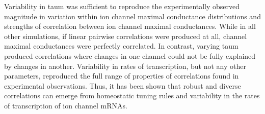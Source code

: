 Variability in \ac{taum} was sufficient to reproduce the experimentally observed magnitude in variation within ion channel maximal conductance distributions and strengths of correlation between ion channel maximal conductances.
While in all other simulations, if linear pairwise correlations were produced at all, channel maximal conductances were perfectly correlated. In contrast, varying \ac{taum} produced correlations where changes in one channel could not be fully explained by changes in another. Variability in rates of transcription, but not any other parameters, reproduced the full range of properties of correlations found in experimental observations\cite{santin_membrane_2019,schulz_quantitative_2007,schulz_variable_2006}. Thus, it has been shown that robust and diverse correlations can emerge from homeostatic tuning rules and variability in the rates of transcription of ion channel mRNAs.

